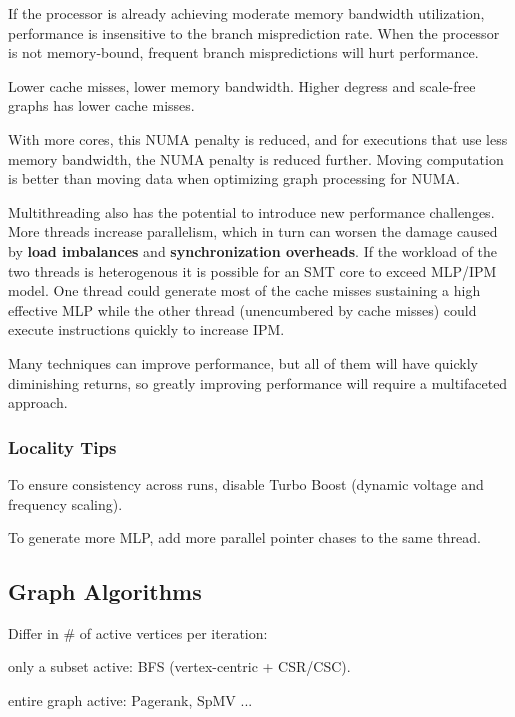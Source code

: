 \documentclass[UTF8,12pt,a4paper]{article}
\begin{document}
If the processor is already achieving moderate memory bandwidth utilization,
performance is insensitive to the branch misprediction rate.
When the processor is not memory-bound,
frequent branch mispredictions will hurt performance.

Lower cache misses, lower memory bandwidth.
Higher degress and scale-free graphs has lower cache misses.

With more cores, this NUMA penalty is reduced,
and for executions that use less memory bandwidth,
the NUMA penalty is reduced further.
Moving computation is better than moving data
when optimizing graph processing for NUMA.

Multithreading also has the potential to introduce new performance challenges.
More threads increase parallelism, which in turn can worsen the damage
caused by \textbf{load imbalances} and \textbf{synchronization overheads}.
If the workload of the two threads is heterogenous it is possible
for an SMT core to exceed MLP/IPM model.
One thread could generate most of the cache misses
sustaining a high effective MLP
while the other thread (unencumbered by cache misses)
could execute instructions quickly to increase IPM.

Many techniques can improve performance,
but all of them will have quickly diminishing returns,
so greatly improving performance will require a multifaceted approach.
\subsubsection{Locality Tips}
\begin{compactitem}
  \item To ensure consistency across runs,
  disable Turbo Boost (dynamic voltage and frequency scaling).
  \item To generate more MLP,
  add more parallel pointer chases to the same thread.
\end{compactitem}

\subsection{Graph Algorithms}
Differ in \# of active vertices per iteration:
\begin{compactitem}
  \item only a subset active: BFS (vertex-centric + CSR/CSC).
  \item entire graph active: Pagerank, SpMV ...
\end{compactitem}
\end{document}
